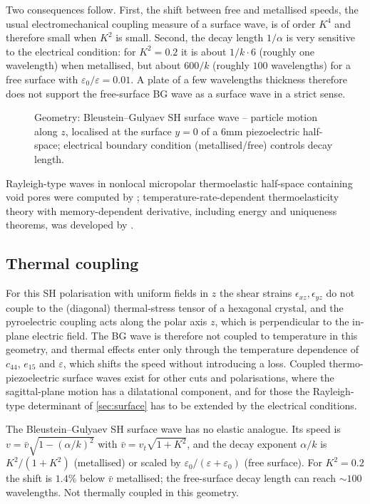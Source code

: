 Two consequences follow. First, the shift between free and metallised speeds, the usual electromechanical coupling measure of a surface wave, is of order $K^4$ and therefore small when $K^2$ is small. Second, the decay length $1/\alpha$ is very sensitive to the electrical condition: for $K^2=0.2$ it is about $1/k\cdot6$ (roughly one wavelength) when metallised, but about $600/k$ (roughly $100$ wavelengths) for a free surface with $\varepsilon_0/\varepsilon=0.01$. A plate of a few wavelengths thickness therefore does not support the free-surface BG wave as a surface wave in a strict sense.

\begin{figure}[t!]\centering\small

\caption{Geometry: Bleustein--Gulyaev SH surface wave -- particle motion along $z$, localised at the surface $y=0$ of a 6mm piezoelectric half-space; electrical boundary condition (metallised/free) controls decay length.}\label{fig:bg-geo}
\end{figure}

Rayleigh-type waves in nonlocal micropolar thermoelastic half-space containing void pores were computed by \citep{Kumar2024b}; temperature-rate-dependent thermoelasticity theory with memory-dependent derivative, including energy and uniqueness theorems, was developed by \citep{Singh2020d}.

\subsection{Thermal coupling}
For this SH polarisation with uniform fields in $z$ the shear strains $\epsilon_{xz},\epsilon_{yz}$ do not couple to the (diagonal) thermal-stress tensor of a hexagonal crystal, and the pyroelectric coupling acts along the polar axis $z$, which is perpendicular to the in-plane electric field. The BG wave is therefore not coupled to temperature in this geometry, and thermal effects enter only through the temperature dependence of $c_{44}$, $e_{15}$ and $\varepsilon$, which shifts the speed without introducing a loss. Coupled thermo-piezoelectric surface waves exist for other cuts and polarisations, where the sagittal-plane motion has a dilatational component, and for those the Rayleigh-type determinant of \cref{sec:surface} has to be extended by the electrical conditions.

\begin{summarybox}[Summary]
The Bleustein--Gulyaev SH surface wave has no elastic analogue. Its speed is $v=\bar v\sqrt{1-(\alpha/k)^2}$ with $\bar v=v_t\sqrt{1+K^2}$, and the decay exponent $\alpha/k$ is $K^2/(1+K^2)$ (metallised) or scaled by $\varepsilon_0/(\varepsilon+\varepsilon_0)$ (free surface). For $K^2=0.2$ the shift is $1.4\%$ below $\bar v$ metallised; the free-surface decay length can reach $\sim100$ wavelengths. Not thermally coupled in this geometry.
\end{summarybox}
